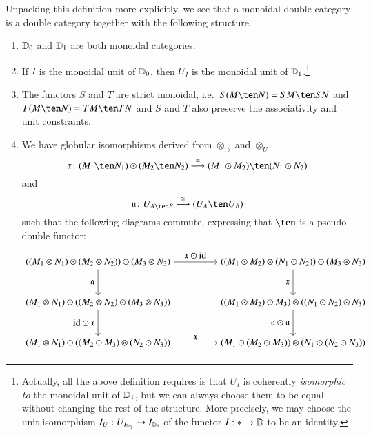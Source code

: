 Unpacking this definition more explicitly, we see that a monoidal
double category is a double category together with the following
structure.
\begin{enumerate}
\item $\mathbb{D}_0$ and $\mathbb{D}_1$ are both monoidal categories.
\item If $I$ is the monoidal unit of $\mathbb{D}_0$, then $U_I$ is the
  monoidal unit of $\mathbb{D}_1$.\footnote{Actually, all the above
    definition requires is that $U_I$ is coherently \emph{isomorphic
      to} the monoidal unit of $\mathbb{D}_1$, but we can always choose them
    to be equal without changing the rest of the structure.
    More precisely, we may choose the unit isomorphism
    $I_U : U_{I_{\mathbb{D}_0}} \to I_{\mathbb{D}_1}$ of the functor $I:* \to \mathbb{D}$
    to be an identity.}
\item The functors $S$ and $T$ are strict monoidal, i.e.\ $S(M\ten N)
  = SM\ten SN$ and $T(M\ten N)=TM\ten TN$ and $S$ and $T$ also
  preserve the associativity and unit constraints.
\item \label{eq:mon1} We have globular isomorphisms derived from $\otimes_{\odot}$ and $\otimes_U$
  \[\fx\maps (M_1\ten N_1)\odot (M_2\ten N_2)\too[\iso] (M_1\odot M_2)\ten (N_1\odot N_2)\]
  and
  \[\fu\maps U_{A\ten B} \too[\iso] (U_A \ten U_B)\]
  such that the following diagrams commute, expressing that $\ten$ is a pseudo double functor:
\begin{equation}\label{eq:mondoub1}
\begin{aligned}
\begin{tikzpicture}[xscale=1.8, yscale=1.5]
\node (tl) at (0,2) {$((M_1 \tens N_1)\odot (M_2 \tens N_2)) \odot (M_3 \tens N_3)$};
\node (tr) at (4,2) {$((M_1 \odot M_2) \tens (N_1 \odot N_2)) \odot (M_3 \tens N_3)$};
\node (ml) at (0,1) {$(M_1 \tens N_1) \odot ((M_2 \tens N_2) \odot (M_3 \tens N_3))$};
\node (mr) at (4,1) {$((M_1 \odot M_2) \odot M_3) \tens ((N_1 \odot N_2) \odot N_3)$};
\node (bl) at (0,0) {$(M_1 \tens N_1) \odot ((M_2 \odot M_3) \tens (N_2 \odot N_3))$};
\node (br) at (4,0) {$(M_1 \odot (M_2 \odot M_3)) \tens (N_1 \odot (N_2 \odot N_3))$};
\draw[->] (tl) to node[above] {$\fx \odot \id$} (tr);
\draw[->] (tl) to node[left]{$\fa$} (ml);
\draw[->] (ml) to node[left]{$\id\odot \fx$} (bl);
\draw[->] (tr) to node[left]{$\fx$} (mr);
\draw[->] (mr) to node[left]{$\fa \odot \fa$} (br);
\draw[->] (bl) to node[above] {$\fx$} (br);
\end{tikzpicture}
    \end{aligned}
\end{equation}


\end{enumerate}
